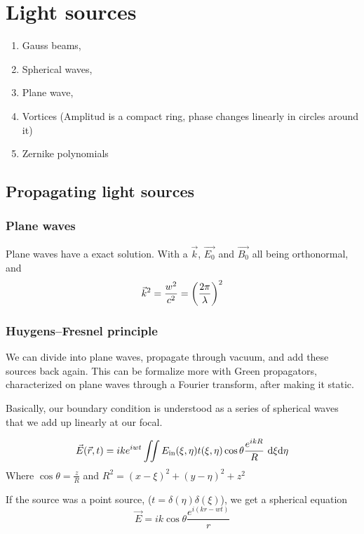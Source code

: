 \documentclass[../main/main.tex]{subfiles}
\begin{document}
\section{Light sources}

\begin{enumerate}
	\item Gauss beams,
	\item Spherical waves,
	\item Plane wave,
	\item Vortices (Amplitud is a compact ring, phase changes linearly in circles around it)
	\item Zernike polynomials

\end{enumerate}

\subsection{Propagating light sources}

\subsubsection{Plane waves}
Plane waves have a exact solution. With a $\vec{k}$, $\vec{E_{0}}$ and $\vec{B_{0}}$ all being orthonormal, and
\begin{equation}
\vec{k}^{2} = \frac{w^{2}}{c^{2}} = \qty(\frac{2\pi}{\lambda})^{2}
\end{equation}


\subsubsection{Huygens--Fresnel principle}

We can divide into plane waves, propagate through vacuum, and add these sources back again. This can be formalize more with Green propagators, characterized on plane waves through a Fourier transform, after making it static.

Basically, our boundary condition is understood as a series of spherical waves that we add up linearly at our focal.


\begin{equation}
\vec{E}(\vec{r}, t) = ik e ^{iwt} \iint E_{\textrm{in}}(\xi, \eta) t(\xi, \eta) \cos \theta \frac {e ^{i k R}} {R}\ \dd  \xi \dd \eta
\end{equation}
Where $\cos\theta = \frac z R$ and $R^{2} = (x-\xi)^{2}+ (y-\eta)^{2} + z^{2}$

If the source was a point source, ($t = \delta(\eta)\delta(\xi)$), we get a spherical equation
\begin{equation*}
\vec{E} =  i k  \cos \theta \frac {e ^{i (k r - wt)}} {r}
\end{equation*}
\end{document}
